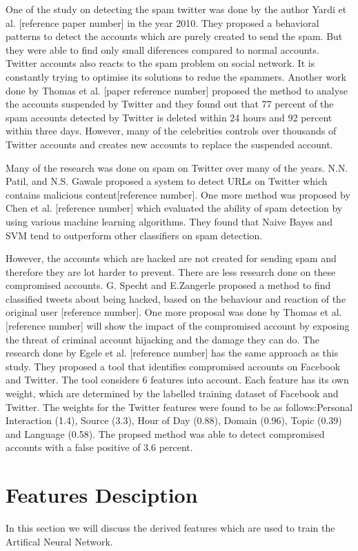 \documentclass[conference]{IEEEtran}
\begin{document}
One of the study on detecting the spam twitter was done by the author Yardi et al. [reference paper number] in the year 2010. They proposed a behavioral patterns to detect the accounts which are purely created to send the spam. But they were able to find only small diferences compared to normal accounts. Twitter accounts also reacts to the spam problem on social network. It is constantly trying to optimise its solutions to redue the spammers. Another work done by Thomas et al. [paper reference number] proposed the method to analyse the accounts suspended by Twitter and they found out that 77 percent of the spam accounts detected by Twitter is deleted within 24 hours and 92 percent within three days. However, many of the celebrities controls over thousands of Twitter accounts and creates new accounts to replace the suspended account. 

Many of the research was done on spam on Twitter over many of the years. N.N. Patil, and N.S. Gawale proposed a system to detect URLs on Twitter which contains malicious content[reference number]. One more method was proposed by Chen et al. [reference number] which evaluated the ability of spam detection by using various machine learning algorithms. They found that Naive Bayes and SVM tend to outperform other classifiers on spam detection.

However, the accounts which are hacked are not created for sending spam and therefore they are lot harder to prevent. There are less research done on these compromised accounts. G. Specht and  E.Zangerle proposed a method to find classified tweets about being hacked,
based on the behaviour and reaction of the original user [reference number]. One more proposal was done by Thomas et al. [reference number] will show the impact of the compromised account by exposing the threat of criminal account hijacking and the damage they can do. The research done by Egele et al. [reference number]  has the same approach as this study. They proposed a tool that identifies compromised accounts on Facebook and Twitter. The tool considers 6 features into account. Each feature has its own weight, which are determined  by the labelled training dataset of Facebook and Twitter. The weights for the Twitter features were found to be as follows:Personal Interaction (1.4),  Source (3.3), Hour of Day (0.88), Domain (0.96), Topic (0.39) and  Language (0.58). The propsed method was able to detect compromised accounts with a false positive of 3.6 percent.

\section{Features Desciption}
\label{featureDescription}
In this section we will discuss the derived features which are used to train the Artifical Neural Network.
\end{document}
